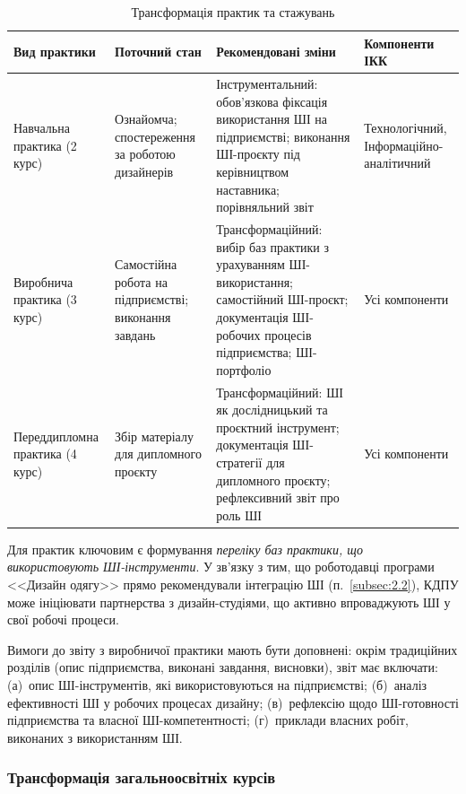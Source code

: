 \begin{table}[htbp]
\centering
\caption{Трансформація практик та стажувань}\label{tab:practice-transform}
\small
\begin{tabularx}{\textwidth}{@{}p{}p{}p{}p{}@{}}
\toprule
\textbf{Вид практики} & \textbf{Поточний стан} & \textbf{Рекомендовані зміни} & \textbf{Компоненти ІКК} \\
\midrule
Навчальна практика (2 курс) & Ознайомча; спостереження за роботою дизайнерів & Інструментальний: обов'язкова фіксація використання ШІ на підприємстві; виконання ШІ-проєкту під керівництвом наставника; порівняльний звіт & Технологічний, Інформаційно-аналітичний \\
\addlinespace
Виробнича практика (3 курс) & Самостійна робота на підприємстві; виконання завдань & Трансформаційний: вибір баз практики з урахуванням ШІ-використання; самостійний ШІ-проєкт; документація ШІ-робочих процесів підприємства; ШІ-портфоліо & Усі компоненти \\
\addlinespace
Переддипломна практика (4 курс) & Збір матеріалу для дипломного проєкту & Трансформаційний: ШІ як дослідницький та проєктний інструмент; документація ШІ-стратегії для дипломного проєкту; рефлексивний звіт про роль ШІ & Усі компоненти \\
\bottomrule
\end{tabularx}
\end{table}

Для практик ключовим є формування \textit{переліку баз практики, що використовують ШІ-інструменти}. У зв'язку з тим, що роботодавці програми <<Дизайн одягу>> прямо рекомендували інтеграцію ШІ (п.~\ref{subsec:2.2}), КДПУ може ініціювати партнерства з дизайн-студіями, що активно впроваджують ШІ у свої робочі процеси.

Вимоги до звіту з виробничої практики мають бути доповнені: окрім традиційних розділів (опис підприємства, виконані завдання, висновки), звіт має включати: (а)~опис ШІ-інструментів, які використовуються на підприємстві; (б)~аналіз ефективності ШІ у робочих процесах дизайну; (в)~рефлексію щодо ШІ-готовності підприємства та власної ШІ-компетентності; (г)~приклади власних робіт, виконаних з використанням ШІ.

\subsubsection{Трансформація загальноосвітніх курсів}\label{sssec:3.2.7}

